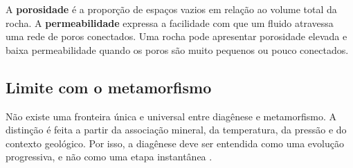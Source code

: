 A \textbf{porosidade} é a proporção de espaços vazios em relação ao volume total da rocha. A \textbf{permeabilidade} expressa a facilidade com que um fluido atravessa uma rede de poros conectados. Uma rocha pode apresentar porosidade elevada e baixa permeabilidade quando os poros são muito pequenos ou pouco conectados.

\subsection{Limite com o metamorfismo}

Não existe uma fronteira única e universal entre diagênese e metamorfismo. A distinção é feita a partir da associação mineral, da temperatura, da pressão e do contexto geológico. Por isso, a diagênese deve ser entendida como uma evolução progressiva, e não como uma etapa instantânea \parencite{nichols2009}.
